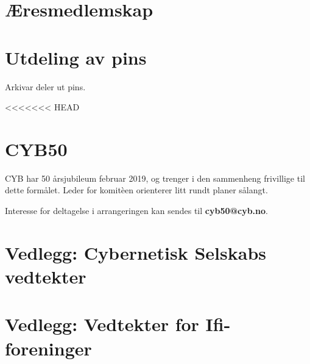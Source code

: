 \documentclass[10pt,norsk,a4paper]{article}
\begin{document}
\section{Æresmedlemskap}

\section{Utdeling av pins}

Arkivar deler ut pins.

<<<<<<< HEAD
\section{CYB50}

CYB har 50 årsjubileum februar 2019, og trenger i den sammenheng frivillige til dette formålet. Leder for komitèen orienterer litt rundt planer sålangt.

Interesse for deltagelse i arrangeringen kan sendes til \textbf{cyb50@cyb.no}.

\section*{Vedlegg: Cybernetisk Selskabs vedtekter}%
\section*{Vedlegg: Vedtekter for Ifi-foreninger}%
\label{lastpage}

\newpage



\end{document}
